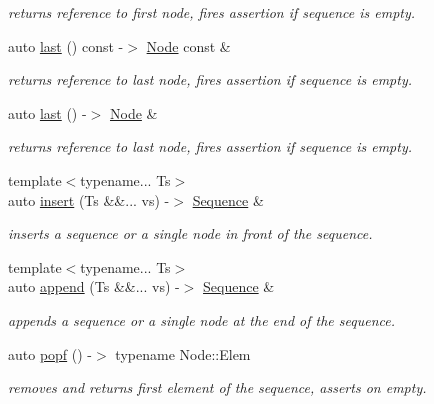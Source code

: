 \begin{DoxyCompactItemize}
\begin{DoxyCompactList}\small\item\em returns reference to first node, fires assertion if sequence is empty. \end{DoxyCompactList}\item 
auto \mbox{\hyperlink{structSequence_a236403b837ccd3e7c42ee880809ee7bd}{last}} () const -\/$>$ \mbox{\hyperlink{structSequence_1_1Node}{Node}} const \&
\begin{DoxyCompactList}\small\item\em returns reference to last node, fires assertion if sequence is empty. \end{DoxyCompactList}\item 
auto \mbox{\hyperlink{structSequence_a6fe042cd5200902a88c92510a6f37b19}{last}} () -\/$>$ \mbox{\hyperlink{structSequence_1_1Node}{Node}} \&
\begin{DoxyCompactList}\small\item\em returns reference to last node, fires assertion if sequence is empty. \end{DoxyCompactList}\item 
{\footnotesize template$<$typename... Ts$>$ }\\auto \mbox{\hyperlink{structSequence_ad11535a8ff826be81bcb3e80081d4651}{insert}} (Ts \&\&... vs) -\/$>$ \mbox{\hyperlink{structSequence}{Sequence}} \&
\begin{DoxyCompactList}\small\item\em inserts a sequence or a single node in front of the sequence. \end{DoxyCompactList}\item 
{\footnotesize template$<$typename... Ts$>$ }\\auto \mbox{\hyperlink{structSequence_a64bd7f922b3cbf1dbb231f322ea4550b}{append}} (Ts \&\&... vs) -\/$>$ \mbox{\hyperlink{structSequence}{Sequence}} \&
\begin{DoxyCompactList}\small\item\em appends a sequence or a single node at the end of the sequence. \end{DoxyCompactList}\item 
auto \mbox{\hyperlink{structSequence_ab501278d50dca097b17bc9af8d25f6d4}{popf}} () -\/$>$ typename Node\+::\+Elem
\begin{DoxyCompactList}\small\item\em removes and returns first element of the sequence, asserts on empty. \end{DoxyCompactList}\item 

\end{DoxyCompactItemize}
